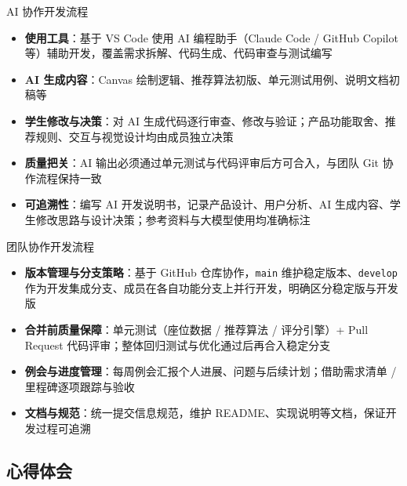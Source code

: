 \documentclass{beamer}
\begin{document}
\begin{frame}{AI 协作开发流程}
  \begin{itemize}
    \setlength{\itemsep}{4pt}
    \item \textbf{使用工具}：基于 VS Code 使用 AI 编程助手（Claude Code / GitHub Copilot 等）辅助开发，覆盖需求拆解、代码生成、代码审查与测试编写
    \item \textbf{AI 生成内容}：Canvas 绘制逻辑、推荐算法初版、单元测试用例、说明文档初稿等
    \item \textbf{学生修改与决策}：对 AI 生成代码逐行审查、修改与验证；产品功能取舍、推荐规则、交互与视觉设计均由成员独立决策
    \item \textbf{质量把关}：AI 输出必须通过单元测试与代码评审后方可合入，与团队 Git 协作流程保持一致
    \item \textbf{可追溯性}：编写 AI 开发说明书，记录产品设计、用户分析、AI 生成内容、学生修改思路与设计决策；参考资料与大模型使用均准确标注
  \end{itemize}
\end{frame}

\begin{frame}{团队协作开发流程}
  \begin{itemize}
    \setlength{\itemsep}{4pt}
    \item \textbf{版本管理与分支策略}：基于 GitHub 仓库协作，\texttt{main} 维护稳定版本、\texttt{develop} 作为开发集成分支、成员在各自功能分支上并行开发，明确区分稳定版与开发版
    \item \textbf{合并前质量保障}：单元测试（座位数据 / 推荐算法 / 评分引擎）+ Pull Request 代码评审；整体回归测试与优化通过后再合入稳定分支
    \item \textbf{例会与进度管理}：每周例会汇报个人进展、问题与后续计划；借助需求清单 / 里程碑逐项跟踪与验收
    \item \textbf{文档与规范}：统一提交信息规范，维护 README、实现说明等文档，保证开发过程可追溯
  \end{itemize}
\end{frame}

\subsection{心得体会}
\end{document}
